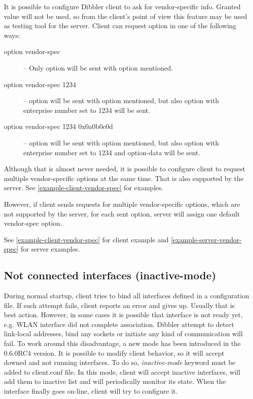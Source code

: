 It is possible to configure Dibbler client to ask for vendor-specific
info. Granted value will not be used, so from the client's point of
view this feature may be used as testing tool for the server. Client
can request  option in one of the
following ways:

\begin{description}
\item[option vendor-spec] -- Only  option will be
  sent with  option mentioned.
\item[option vendor-spec 1234] --  option will be
  sent with  option mentioned, but also
   option with enterprise number set to 1234
  will be sent.
\item[option vendor-spec 1234 0x0a0b0c0d] -- 
  option will be sent with  option mentioned,
  but also  option with enterprise number set to
  1234 and option-data will be sent.
\end{description}

Although that is almost never needed, it is possible to configure
client to request multiple vendor-specific options at the same
time. That is also supported by the server. See
\ref{example-client-vendor-spec} for examples.


However, if client sends requests for multiple vendor-specific
options, which are not supported by the server, for each sent option,
server will assign one default vendor-spec option.

See \ref{example-client-vendor-spec} for client example and
\ref{example-server-vendor-spec} for server examples.

\subsection{Not connected interfaces (inactive-mode)}
\label{feature-inactive-mode}
During normal startup, client tries to bind all interfaces defined in
a configuration file. If such attempt fails, client reports an error
and gives up. Usually that is best action. However, in some cases it
is possible that interface is not ready yet, e.g. WLAN interface did
not complete association. Dibbler attempt to detect link-local
addresses, bind any sockets or initiate any kind of communication will
fail. To work around this disadvantage, a new mode has been
introduced in the 0.6.0RC4 version. It is possible to modify client
behavior, so it will accept downed and not running interfaces. To do
so, \emph{inactive-mode} keyword must be added to client.conf file. In
this mode, client will accept inactive interfaces, will add them to
inactive list and will periodically monitor its state. When the
interface finally goes on-line, client will try to configure it.

